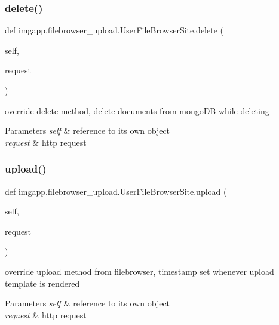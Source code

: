 \subsubsection{\texorpdfstring{delete()}{delete()}}
{\footnotesize\ttfamily def imgapp.\+filebrowser\+\_\+upload.\+User\+File\+Browser\+Site.\+delete (\begin{DoxyParamCaption}\item[{}]{self,  }\item[{}]{request }\end{DoxyParamCaption})}



override delete method, delete documents from mongo\+DB while deleting 


\begin{DoxyParams}{Parameters}
{\em self} & reference to it\textquotesingle{}s own object \\
\hline
{\em request} & http request \\
\hline
\end{DoxyParams}
\mbox{\label{classimgapp_1_1filebrowser__upload_1_1UserFileBrowserSite_a07e6d41b7640acdd9a559e42c1b4229e}} 
\subsubsection{\texorpdfstring{upload()}{upload()}}
{\footnotesize\ttfamily def imgapp.\+filebrowser\+\_\+upload.\+User\+File\+Browser\+Site.\+upload (\begin{DoxyParamCaption}\item[{}]{self,  }\item[{}]{request }\end{DoxyParamCaption})}



override upload method from filebrowser, timestamp set whenever upload template is rendered 


\begin{DoxyParams}{Parameters}
{\em self} & reference to it\textquotesingle{}s own object \\
\hline
{\em request} & http request \\
\hline
\end{DoxyParams}


